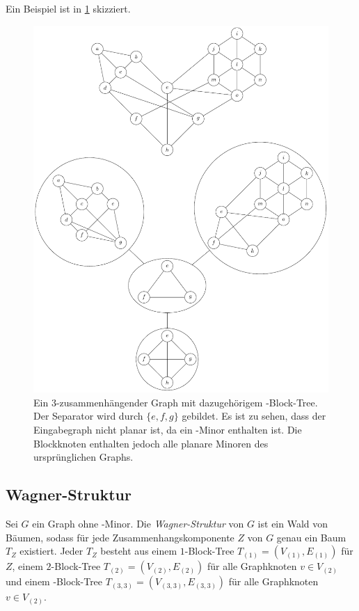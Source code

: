 Ein Beispiel ist in \Abb \ref{fig:33-Block-Tree} skizziert.
\begin{figure}[H]
  \centering
  \includegraphics[width=\textwidth,height=\textheight,keepaspectratio]{bilder/33-Block-Tree.pdf}
  \caption{Ein $3$-zusammenhängender Graph mit dazugehörigem \dd-Block-Tree.
           Der Separator wird durch $\{e, f, g\}$ gebildet.
           Es ist zu sehen, dass der Eingabegraph nicht planar ist, da ein \kdd-Minor enthalten ist.
           Die Blockknoten enthalten jedoch alle planare Minoren des ursprünglichen Graphs.}
  \label{fig:33-Block-Tree}
\end{figure}


\subsection{Wagner-Struktur}
\begin{definition}\label{eq:WagnerStruktur}
  Sei $G$ ein Graph ohne \kf-Minor.
  Die \emph{Wagner-Struktur} von $G$ ist ein Wald von Bäumen, sodass für jede Zusammenhangskomponente $Z$ von $G$ genau ein Baum $T_Z$ existiert.
  Jeder $T_Z$ besteht aus einem $1$-Block-Tree $T_{(1)} = (V_{(1)}, E_{(1)})$ für $Z$, einem $2$-Block-Tree $T_{(2)} = (V_{(2)}, E_{(2)})$ für alle Graphknoten $v \in V_{(2)}$ und einem \dd-Block-Tree $T_{(3, 3)} = (V_{(3, 3)}, E_{(3, 3)})$ für alle Graphknoten $v \in V_{(2)}$\cite{ReL}.
\end{definition}

